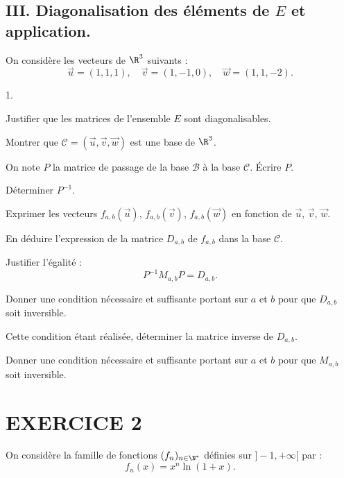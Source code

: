 \documentclass[11pt]{article}%
\begin{document}
\subsection*{III. Diagonalisation des éléments de $E$ et application.}

On considère les vecteurs de $\R^{3}$ suivants : 
\[
\vec{u} = (1,1,1),\quad \vec{v} = (1,-1,0),\quad \vec{w} = (1,1,-2).
\]

\begin{noliste}{1.}
 \setlength{\itemsep}{4mm}
\item Justifier que les matrices de l'ensemble $E$ sont
diagonalisables.

\item Montrer que $\mathcal{C} = \left( \vec{u},\vec{v},\vec{w}\right)
$ est
une base de $\R^{3}$.

\item On note $P$ la matrice de passage de la base $\mathcal{B}$ à la
base $\mathcal{C}$. Écrire $P$.

\item Déterminer $P^{-1}$.

\item Exprimer les vecteurs $f_{a,b}\left( \vec{u}\right) $,
$f_{a,b}\left( 
\vec{v}\right) $, $f_{a,b}\left( \vec{w}\right) $ en fonction de
$\vec{u}$, $\vec{v}$, $\vec{w}$.

\item En déduire l'expression de la matrice $D_{a,b}$ de $f_{a,b}$ dans
la
base $\mathcal{C}$.

\item Justifier l'égalité : 
\[
P^{-1}M_{a,b}P = D_{a,b}.
\]

\item Donner une condition nécessaire et suffisante portant sur $a$ et
$b$
pour que $D_{a,b}$ soit inversible.

\item Cette condition étant réalisée, déterminer la matrice inverse de
$
D_{a,b}$.

\item Donner une condition nécessaire et suffisante portant sur $a$ et
$b$
pour que $M_{a,b}$ soit inversible.
\end{noliste}

\section*{EXERCICE 2}

On considère la famille de fonctions $(f_{n})_{n\in \N^{\ast }}$
définies sur $]-1, + \infty \lbrack $ par : 
\[
f_{n}(x) = x^{n}\ln (1 + x).
\]
\end{document}
